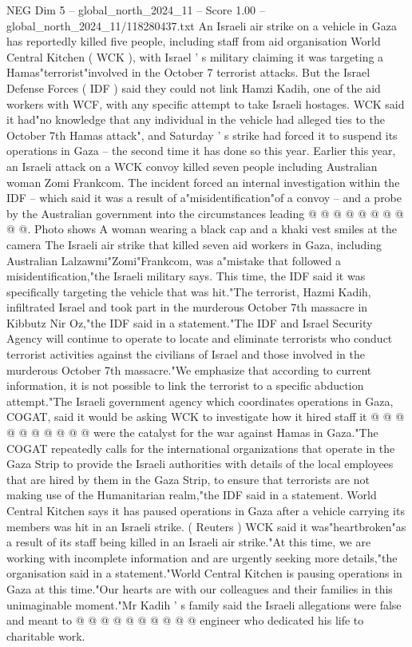 \begin{textsample}{NEG Dim 5 – global\_north\_2024\_11 – Score 1.00 – global\_north\_2024\_11/118280437.txt}  \label{ex:f5_neg_417}
An Israeli air strike on a vehicle in Gaza has reportedly killed five people, including staff from aid organisation World Central Kitchen ( WCK ), with Israel ' s military claiming it was targeting a Hamas"terrorist"involved in the October 7 terrorist attacks.
But the Israel Defense Forces ( IDF ) said they could not link Hamzi Kadih, one of the aid workers with WCF, with any specific attempt to take Israeli hostages.
WCK said it had"no knowledge that any individual in the vehicle had alleged ties to the October 7th Hamas attack", and Saturday ' s strike had forced it to suspend its operations in Gaza -- the second time it has done so this year.
Earlier this year, an Israeli attack on a WCK convoy killed seven people including Australian woman Zomi Frankcom.
The incident forced an internal investigation within the IDF -- which said it was a result of a"misidentification"of a convoy -- and a probe by the Australian government into the circumstances leading @ @ @ @ @ @ @ @ @ @.
Photo shows A woman wearing a black cap and a khaki vest smiles at the camera The Israeli air strike that killed seven aid workers in Gaza, including Australian Lalzawmi"Zomi"Frankcom, was a"mistake that followed a misidentification,"the Israeli military says.
This time, the IDF said it was specifically targeting the vehicle that was hit."The terrorist, Hazmi Kadih, infiltrated Israel and took part in the murderous October 7th massacre in Kibbutz Nir Oz,"the IDF said in a statement."The IDF and Israel Security Agency will continue to operate to locate and eliminate terrorists who conduct terrorist activities against the civilians of Israel and those involved in the murderous October 7th massacre."We emphasize that according to current information, it is not possible to link the terrorist to a specific abduction attempt."The Israeli government agency which coordinates operations in Gaza, COGAT, said it would be asking WCK to investigate how it hired staff it @ @ @ @ @ @ @ @ @ @ were the catalyst for the war against Hamas in Gaza."The COGAT repeatedly calls for the international organizations that operate in the Gaza Strip to provide the Israeli authorities with details of the local employees that are hired by them in the Gaza Strip, to ensure that terrorists are not making use of the Humanitarian realm,"the IDF said in a statement.
World Central Kitchen says it has paused operations in Gaza after a vehicle carrying its members was hit in an Israeli strike. ( Reuters ) WCK said it was"heartbroken"as a result of its staff being killed in an Israeli air strike."At this time, we are working with incomplete information and are urgently seeking more details,"the organisation said in a statement."World Central Kitchen is pausing operations in Gaza at this time."Our hearts are with our colleagues and their families in this unimaginable moment."Mr Kadih ' s family said the Israeli allegations were false and meant to @ @ @ @ @ @ @ @ @ @ engineer who dedicated his life to charitable work.

\end{textsample}
